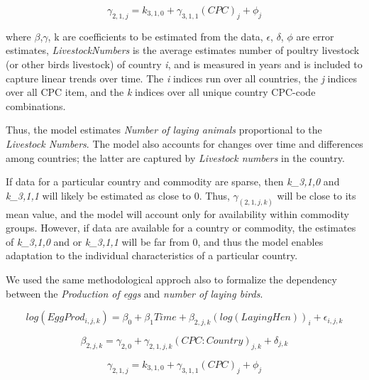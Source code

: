 \documentclass[nojss]{jss}
\begin{document}
\begin{dmath*}
\gamma_{2,1,j}= k_{3,1,0} + \gamma_{3,1,1}(CPC)_j +\phi_{j}
\end{dmath*}



where $\beta$,$\gamma$, k are coefficients to be estimated from the data, $\epsilon$, $\delta$, $\phi$ are error estimates, \textit{LivestockNumbers} is the average estimates number of poultry livestock (or other birds livestock) of country \textit{i}, and  is measured in years and is included to capture linear trends over time. The \textit{i} indices run over all countries, the \textit{j} indices over all CPC item, and the \textit{k} indices over all unique country CPC-code combinations.

Thus, the model estimates \textit{Number of laying animals} proportional to the \textit{Livestock Numbers}. The model also accounts for changes over time and differences among countries; the latter are captured by \textit{Livestock numbers} in the country.

If data for a particular country and commodity are sparse, then \textit{k_3,1,0}  and \textit{k_3,1,1} will likely be estimated as close to 0. Thus, $\gamma_(2,1,j,k)$ will be close to its mean value, and the model will account only for availability within commodity groups. However, if data are available for a country or commodity, the estimates of \textit{k_3,1,0} and or \textit{k_3,1,1} will be far from 0, and thus the model enables adaptation to the individual characteristics of a particular country.



We used the same methodological approch also to formalize the dependency between the \textit{Production of eggs} and \textit{number of laying birds}. 

\begin{dmath*}
log(EggProd_{i,j,k})= \beta_0 + \beta_{1}Time + \beta_{2,j,k}(log(LayingHen))_{i}+\epsilon_{i,j,k}
\end{dmath*}


\begin{dmath*}
\beta_{2,j,k}= \gamma_{2,0} + \gamma_{2,1,j,k}(CPC:Country)_{j,k}+\delta_{j,k}
\end{dmath*}


\begin{dmath*}
\gamma_{2,1,j}= k_{3,1,0} + \gamma_{3,1,1}(CPC)_j +\phi_{j}
\end{dmath*}
\end{document}

